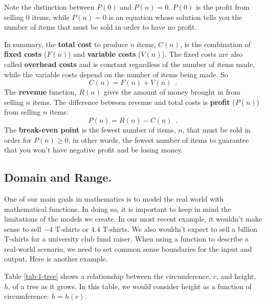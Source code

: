 \begin{note}
Note the distinction between $P(0)$ and $P(n)=0$. $P(0)$ is the profit from selling 0 items, while $P(n)=0$ is an equation whose solution tells you the number of items that must be sold in order to have no profit.
\end{note}

\begin{definition}
In summary, the {\bf total cost} to produce $n$ items, $C(n)$, is the combination of {\bf fixed costs} ($F(n)$) and {\bf variable costs} ($V(n)$). The fixed costs are also called {\bf overhead costs} and is constant regardless of the number of items made, while the variable costs depend on the number of items being made. So
$$C(n) = F(n) + V(n)\enspace .$$
The {\bf revenue} function, $R(n)$ gives the amount of money brought in from selling $n$ items. The difference between revenue and total costs is {\bf profit} ($P(n)$) from selling $n$ items:
$$ P(n) = R(n) - C(n)\enspace .$$
The {\bf break-even point} is the fewest number of items, $n$, that must be sold in order for $P(n) \geq 0$, in other words, the fewest number of items to guarantee that you won't have negative profit and be losing money.
\end{definition}

\subsection{Domain and Range.}

One of our main goals in mathematics is to model the real world with mathematical functions. In doing so, it is important to keep in mind the limitations of the models we create. In our most recent example, it wouldn't make sense to sell $-4$ T-shirts or $4.4$ T-shirts. We also wouldn't expect to sell a billion T-shirts for a university club fund raiser. When using a function to describe a real-world scenario, we need to set common sense boundaries for the input and output. Here is another example.

Table \ref{tab:1-tree} shows a relationship between the circumference, $c$, and height, $h$, of a tree as it grows. In this table, we would consider height as a function of circumference: $h = h(c)$.

